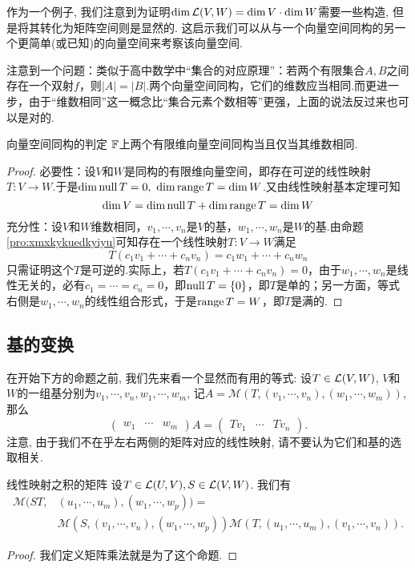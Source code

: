 作为一个例子, 我们注意到为证明$\dim \mathcal{L} (V,W) = \dim V \cdot \dim W$需要一些构造, 但是将其转化为矩阵空间则是显然的. 这启示我们可以从与一个向量空间同构的另一个更简单(或已知)的向量空间来考察该向量空间.

注意到一个问题：类似于高中数学中“集合的对应原理”：若两个有限集合$A,B$之间存在一个双射$f$，则$|A|=|B|$.两个向量空间同构，它们的维数应当相同.而更进一步，由于“维数相同”这一概念比“集合元素个数相等”更强，上面的说法反过来也可以是对的.

\begin{proposition}{向量空间同构的判定}
	$\mathbb{F}$上两个有限维向量空间同构当且仅当其维数相同.
\end{proposition}
\begin{proof}
	 必要性：设$V$和$W$是同构的有限维向量空间，即存在可逆的线性映射$T:V \to W$.于是$\dim \operatorname{null} T = 0,~\dim \operatorname{range} T =\dim W$.又由线性映射基本定理可知$$\dim V = \dim \operatorname{null} T + \dim \operatorname{range} T = \dim W$$
	 充分性：设$V$和$W$维数相同，$v_1, \cdots ,v_n$是$V$的基，$w_1, \cdots ,w_n$是$W$的基.由命题\ref{pro:xmxkykuedkyiyu}可知存在一个线性映射$T:V \to W$满足$$T(c_1v_1 + \cdots + c_nv_n)=c_1w_1 + \cdots + c_nw_n$$
	只需证明这个$T$是可逆的.实际上，若$T(c_1v_1 + \cdots + c_nv_n)=0$，由于$w_1, \cdots ,w_n$是线性无关的，必有$c_1= \cdots = c_n=0$，即$\operatorname{null} T = \{ 0 \}$，即$T$是单的；另一方面，等式右侧是$w_1, \cdots ,w_n$的线性组合形式，于是$\operatorname{range} T = W$，即$T$是满的.
\end{proof}

\subsection{基的变换}

在开始下方的命题之前, 我们先来看一个显然而有用的等式: 设$T \in \mathcal{L} (V,W)$, $V$和$W$的一组基分别为$v_1,\cdots ,v_n, w_1,\cdots ,w_m$, 记$A = \mathcal{M} (T, (v_1,\cdots ,v_n),( w_1,\cdots ,w_m))$, 那么$$\begin{pmatrix}
 w_1 & \cdots & w_m
\end{pmatrix} A = \begin{pmatrix}
 Tv_1 & \cdots & Tv_n
\end{pmatrix}.$$注意, 由于我们不在乎左右两侧的矩阵对应的线性映射, 请不要认为它们和基的选取相关. 

\begin{proposition}{线性映射之积的矩阵}
	设$T \in \mathcal{L} (U,V), S \in \mathcal{L} (V,W)$. 我们有
	\begin{align*}
		\mathcal{M} (ST, &(u_1,\cdots ,u_m), (w_1,\cdots ,w_p)) = \\
		&\mathcal{M} (S,(v_1,\cdots ,v_n),(w_1,\cdots ,w_p)) \mathcal{M} (T,(u_1,\cdots ,u_m),(v_1,\cdots ,v_n)).
	\end{align*}
\end{proposition}
\begin{proof}
	我们定义矩阵乘法就是为了这个命题. 
\end{proof}

